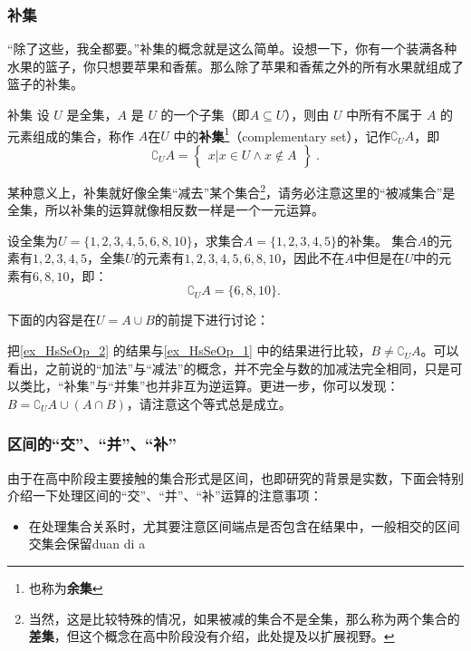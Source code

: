 \subsubsection{补集}

“除了这些，我全都要。”补集的概念就是这么简单。设想一下，你有一个装满各种水果的篮子，你只想要苹果和香蕉。那么除了苹果和香蕉之外的所有水果就组成了篮子的补集。

\begin{definition}{补集}
设 $U$ 是全集，$A$ 是 $U$ 的一个子集（即$A\subseteq U$），则由 $U$ 中所有不属于 $A$ 的元素组成的集合，称作 $A$在$U$ 中的\textbf{补集}\footnote{也称为\textbf{余集}}（complementary set），记作$\complement_UA$，即
\begin{equation}
\complement_UA = \begin{Bmatrix}x|x\in U \wedge x\notin A\end{Bmatrix}~.
\end{equation}
\end{definition}

某种意义上，补集就好像全集“减去”某个集合\footnote{当然，这是比较特殊的情况，如果被减的集合不是全集，那么称为两个集合的\textbf{差集}，但这个概念在高中阶段没有介绍，此处提及以扩展视野。}，请务必注意这里的“被减集合”是全集，所以补集的运算就像相反数一样是一个一元运算。

\begin{example}{设全集为$U=\{1,2,3,4,5,6,8,10\}$，求集合$A=\{1,2,3,4,5\}$的补集。}\label{ex_HsSeOp_2}
集合$A$的元素有$1,2,3,4,5$，全集$U$的元素有$1,2,3,4,5,6,8,10$，因此不在$A$中但是在$U$中的元素有$6,8,10$，即：
$$
\complement_UA=\{6,8,10\}.~
$$
\end{example}

下面的内容是在$U=A\cup B$的前提下进行讨论：

把\autoref{ex_HsSeOp_2} 的结果与\autoref{ex_HsSeOp_1} 中的结果进行比较，$B\neq\complement_UA$。可以看出，之前说的“加法”与“减法”的概念，并不完全与数的加减法完全相同，只是可以类比，“补集”与“并集”也并非互为逆运算。更进一步，你可以发现：$\displaystyle B=\complement_{U}A\cup(A\cap B)$，请注意这个等式总是成立。

\subsubsection{区间的“交”、“并”、“补”}

由于在高中阶段主要接触的集合形式是区间，也即研究的背景是实数，下面会特别介绍一下处理区间的“交”、“并”、“补”运算的注意事项：

\begin{itemize}
\item 在处理集合关系时，尤其要注意区间端点是否包含在结果中，一般相交的区间交集会保留duan di a
\end{itemize}




